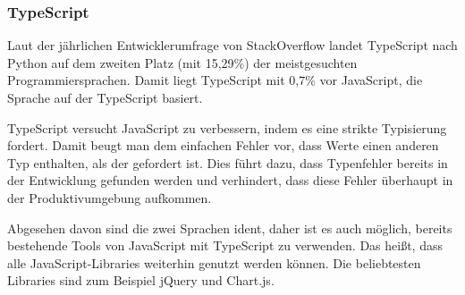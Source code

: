 \subsubsection{TypeScript}

Laut der jährlichen Entwicklerumfrage von StackOverflow landet TypeScript nach Python auf dem zweiten Platz (mit 15,29\%) der meistgesuchten Programmiersprachen. Damit liegt TypeScript mit 0,7\% vor JavaScript, die Sprache auf der TypeScript basiert. \cite{SFT}

TypeScript versucht JavaScript zu verbessern, indem es eine strikte Typisierung fordert. Damit beugt man dem einfachen Fehler vor, dass Werte einen anderen Typ enthalten, als der gefordert ist. Dies führt dazu, dass Typenfehler bereits in der Entwicklung gefunden werden und verhindert, dass diese Fehler überhaupt in der Produktivumgebung aufkommen.

Abgesehen davon sind die zwei Sprachen ident, daher ist es auch möglich, bereits bestehende Tools von JavaScript mit TypeScript zu verwenden. Das heißt, dass alle JavaScript-Libraries weiterhin genutzt werden können. Die beliebtesten Libraries sind zum Beispiel jQuery und Chart.js.
